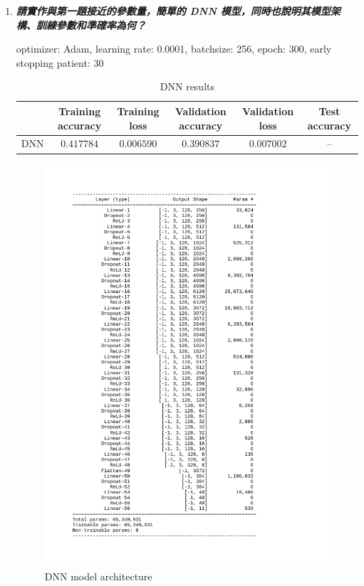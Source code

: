 \documentclass[a4paper,11pt]{article}
\begin{document}
\begin{enumerate}
\newpage
	
	\item \textit{\textbf{請實作與第一題接近的參數量，簡單的 DNN 模型，同時也說明其模型架構、訓練參數和準確率為何？}}

	optimizer: Adam, learning rate: 0.0001, batchsize: 256, epoch: 300, early stopping patient: 30\\

		\begin{table}[htp]
			\begin{center}
				\begin{tabular}{ | c | c | c | c | c | c |}
				  	\hline
			  		& Training accuracy & Training loss & Validation accuracy & Validation loss & Test accuracy\\[0.5ex] 
			  		\hline \hline
			  		DNN & $0.417784$ & $0.006590$ & $0.390837$ & $0.007002$ & --\\[0.2ex]
			  		\hline
				\end{tabular}
				\caption{DNN results}
			\end{center}
		\end{table}

		\begin{figure}[htp]
		    \begin{center}
		    		\includegraphics[scale=0.415]{./dnn_architecture.png}
		    	\caption{DNN model architecture}
		    \end{center}
		\end{figure}


\end{enumerate}
\end{document}

